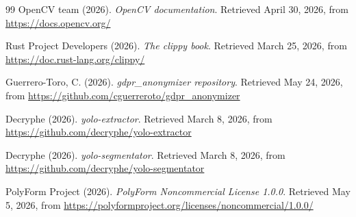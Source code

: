 \begin{thebibliography}{99}
{\sc OpenCV team}
(2026).
\textit{OpenCV documentation}.
Retrieved April 30, 2026, from \url{https://docs.opencv.org/}

{\sc Rust Project Developers}
(2026).
\textit{The clippy book}.
Retrieved March 25, 2026, from \url{https://doc.rust-lang.org/clippy/}

{\sc Guerrero-Toro, C.}
(2026).
\textit{gdpr\_anonymizer repository}.
Retrieved May 24, 2026, from \url{https://github.com/cguerreroto/gdpr_anonymizer}

{\sc Decryphe}
(2026).
\textit{yolo-extractor}.
Retrieved March 8, 2026, from \url{https://github.com/decryphe/yolo-extractor}

{\sc Decryphe}
(2026).
\textit{yolo-segmentator}.
Retrieved March 8, 2026, from \url{https://github.com/decryphe/yolo-segmentator}

{\sc PolyForm Project}
(2026).
\textit{PolyForm Noncommercial License 1.0.0}.
Retrieved May 5, 2026, from \url{https://polyformproject.org/licenses/noncommercial/1.0.0/}

\end{thebibliography}
